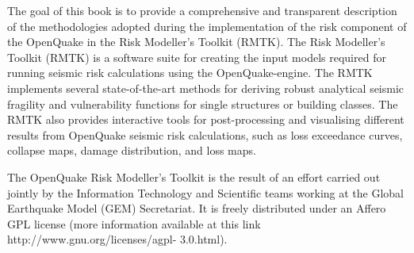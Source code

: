 The goal of this book is to provide a comprehensive and transparent description of the methodologies adopted during the implementation of the risk component of the OpenQuake in the Risk Modeller's Toolkit (RMTK). The Risk Modeller's Toolkit (RMTK) is a software suite for creating the input models required for running seismic risk calculations using the OpenQuake-engine. The RMTK implements several state-of-the-art methods for deriving robust analytical seismic fragility and vulnerability functions for single structures or building classes. The RMTK also provides interactive tools for post-processing and visualising different results from OpenQuake seismic risk calculations, such as loss exceedance curves, collapse maps, damage distribution, and loss maps.

The OpenQuake Risk Modeller's Toolkit is the result of an effort carried out jointly by the Information Technology and Scientific teams working at the Global Earthquake Model (GEM) Secretariat. It is freely distributed under an Affero GPL license (more information available at this link http://www.gnu.org/licenses/agpl- 3.0.html).